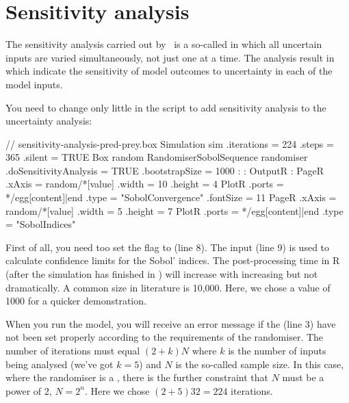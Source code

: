 \FloatBarrier
\section{Sensitivity analysis}
The sensitivity analysis carried out by \US\ is a so-called  in which all uncertain inputs are varied simultaneously, not just one at a time. The analysis result in  \citep[][page~164-167]{Saltelli08} which indicate the sensitivity of model outcomes to uncertainty in each of the model inputs.

You need to change only little in the  script to add sensitivity analysis to the uncertainty analysis:

\lstset{numbers=left}
\begin{boxscript}
// sensitivity-analysis-pred-prey.box
Simulation sim {
  .iterations = 224 
  .steps = 365
  .silent = TRUE
  Box random {
    RandomiserSobolSequence randomiser {
      .doSensitivityAnalysis = TRUE
      .bootstrapSize = 1000
    }
  :
  }
  :
  OutputR {
    :
    PageR {
      .xAxis = random/*[value]
      .width = 10
      .height = 4
      PlotR {
        .ports = */egg[content]|end
        .type = "SobolConvergence"
        .fontSize = 11
      }
    }
    PageR {
      .xAxis = random/*[value]
      .width = 5
      .height = 7
      PlotR {
        .ports = */egg[content]|end
        .type = "SobolIndices"
      }
    }
  }
}
\end{boxscript}
\lstset{numbers=none}

First of all, you need too set the  flag to  (line 8). The  input (line 9) is used to calculate confidence limits for the Sobol' indices. The post-processing time in R (after the simulation has finished in \US) will increase with increasing  but not dramatically. A common size in literature is 10,000. Here, we chose a value of 1000 for a quicker demonstration.

When you run the model, you will receive an error message if the  (line 3) have not been set properly according to the requirements of the randomiser. The number of iterations must equal $(2+k)N$ where $k$ is the number of inputs being analysed (we've got $k=5$) and $N$ is the so-called sample size. In this case, where the randomiser is a , there is the further constraint that $N$ must be a power of 2, $N=2^n$. Here we chose $(2+5)32=224$ iterations.


